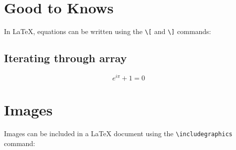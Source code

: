 \documentclass{article}
\begin{document}
\section{Good to Knows}
In LaTeX, equations can be written using the \verb|\[| and \verb|\]| commands:

\subsection{Iterating through array}

\[ e^{i\pi} + 1 = 0 \]

\section{Images}
Images can be included in a LaTeX document using the \verb|\includegraphics| command:

\begin{figure}
\centering
\end{figure}
\end{document}
